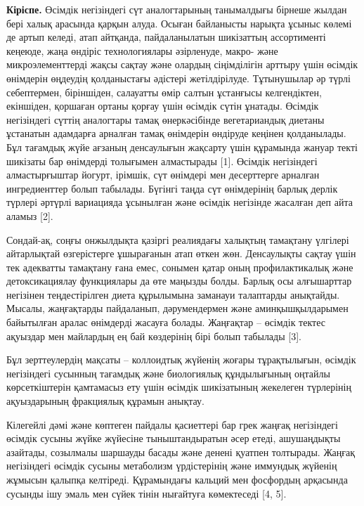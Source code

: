 \begin{multicols}{2}
{\bfseries Кіріспе.} Өсімдік негізіндегі сүт аналогтарының танымалдығы
бірнеше жылдан бері халық арасында қарқын алуда. Осыған байланысты
нарықта ұсыныс көлемі де артып келеді, атап айтқанда, пайдаланылатын
шикізаттың ассортименті кеңеюде, жаңа өндіріс технологиялары әзірленуде,
макро- және микроэлементтерді жақсы сақтау және олардың сіңімділігін
арттыру үшін өсімдік өнімдерін өңдеудің қолданыстағы әдістері
жетілдірілуде. Тұтынушылар әр түрлі себептермен, біріншіден, салауатты
өмір салтын ұстанғысы келгендіктен, екіншіден, қоршаған ортаны қорғау
үшін өсімдік сүтін ұнатады. Өсімдік негізіндегі сүттің аналогтары тамақ
өнеркәсібінде вегетариандық диетаны ұстанатын адамдарға арналған тамақ
өнімдерін өндіруде кеңінен қолданылады. Бұл тағамдық жүйе ағзаның
денсаулығын жақсарту үшін құрамында жануар текті шикізаты бар өнімдерді
толығымен алмастырады {[}1{]}. Өсімдік негізіндегі алмастырғыштар
йогурт, ірімшік, сүт өнімдері мен десерттерге арналған ингредиенттер
болып табылады. Бүгінгі таңда сүт өнімдерінің барлық дерлік түрлері
әртүрлі вариацияда ұсынылған және өсімдік негізінде жасалған деп айта
аламыз {[}2{]}.

Сондай-ақ, соңғы онжылдықта қазіргі реалиядағы халықтың тамақтану
үлгілері айтарлықтай өзгерістерге ұшырағанын атап өткен жөн. Денсаулықты
сақтау үшін тек адекватты тамақтану ғана емес, сонымен қатар оның
профилактикалық және детоксикациялау функциялары да өте маңызды болды.
Барлық осы алғышарттар негізінен теңдестірілген диета құрылымына
заманауи талаптарды анықтайды. Мысалы, жаңғақтарды пайдаланып,
дәрумендермен және аминқышқылдарымен байытылған аралас өнімдерді жасауға
болады. Жаңғақтар -- өсімдік тектес ақуыздар мен майлардың ең бай
көздерінің бірі болып табылады {[}3{]}.

Бұл зерттеулердің мақсаты -- коллоидтық жүйенің жоғары тұрақтылығын,
өсімдік негізіндегі сусынның тағамдық және биологиялық құндылығының
оңтайлы көрсеткіштерін қамтамасыз ету үшін өсімдік шикізатының жекелеген
түрлерінің ақуыздарының фракциялық құрамын анықтау.

Кілегейлі дәмі және көптеген пайдалы қасиеттері бар грек жаңғақ
негізіндегі өсімдік сусыны жүйке жүйесіне тыныштандыратын әсер етеді,
ашушаңдықты азайтады, созылмалы шаршауды басады және денені қуатпен
толтырады. Жаңғақ негізіндегі өсімдік сусыны метаболизм үрдістерінің
және иммундық жүйенің жұмысын қалыпқа келтіреді. Құрамындағы кальций мен
фосфордың арқасында сусынды ішу эмаль мен сүйек тінін нығайтуға
көмектеседі {[}4, 5{]}.


\end{multicols}
